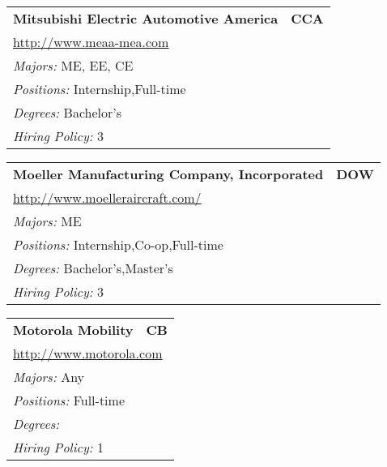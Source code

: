 \documentclass[twoside]{article}
\begin{document}
\begin{center}
\begin{multicols}{3}
\begin{FlushLeft}
\begin{minipage}{.9\columnwidth}
\end{minipage}
 
\begin{minipage}{.9\columnwidth}\begin{tabularx}{.95\columnwidth}{Xr}
                 {\Large\bf Mitsubishi Electric Automotive America} & {\Large\bf CCA}\\
    \multicolumn{2}{p{.95\columnwidth}}{\url{http://www.meaa-mea.com}}\\
    \multicolumn{2}{p{.95\columnwidth}}{\emph{Majors:} ME, EE, CE}\\
    \multicolumn{2}{p{.95\columnwidth}}{\emph{Positions:} Internship,Full-time}\\
    \multicolumn{2}{p{.95\columnwidth}}{\emph{Degrees:} Bachelor's}\\
    \multicolumn{2}{p{.95\columnwidth}}{\emph{Hiring Policy:} 3}\\
    \end{tabularx}
    
\end{minipage}
 
\begin{minipage}{.9\columnwidth}\begin{tabularx}{.95\columnwidth}{Xr}
                 {\Large\bf Moeller Manufacturing Company, Incorporated} & {\Large\bf DOW}\\
    \multicolumn{2}{p{.95\columnwidth}}{\url{http://www.moelleraircraft.com/}}\\
    \multicolumn{2}{p{.95\columnwidth}}{\emph{Majors:} ME}\\
    \multicolumn{2}{p{.95\columnwidth}}{\emph{Positions:} Internship,Co-op,Full-time}\\
    \multicolumn{2}{p{.95\columnwidth}}{\emph{Degrees:} Bachelor's,Master's}\\
    \multicolumn{2}{p{.95\columnwidth}}{\emph{Hiring Policy:} 3}\\
    \end{tabularx}
    
\end{minipage}
 
\begin{minipage}{.9\columnwidth}\begin{tabularx}{.95\columnwidth}{Xr}
                 {\Large\bf Motorola Mobility} & {\Large\bf CB}\\
    \multicolumn{2}{p{.95\columnwidth}}{\url{http://www.motorola.com}}\\
    \multicolumn{2}{p{.95\columnwidth}}{\emph{Majors:} Any}\\
    \multicolumn{2}{p{.95\columnwidth}}{\emph{Positions:} Full-time}\\
    \multicolumn{2}{p{.95\columnwidth}}{\emph{Degrees:} }\\
    \multicolumn{2}{p{.95\columnwidth}}{\emph{Hiring Policy:} 1}\\
    \end{tabularx}
    

\end{minipage}
\end{FlushLeft}
\end{multicols}
\end{center}
\end{document}
